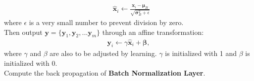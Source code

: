 \documentclass[11pt,letter,notitlepage]{article}
\begin{document}
\begin{exercise}
\begin{enumerate}[resume]
\begin{enumerate}
\begin{align*}
        &\hat{\mathbf{x}}_i \leftarrow \frac{\mathbf{x}_i - \mathbf{\mu}_B}{\sqrt{\mathbf{\sigma}_B^2 + \epsilon}}
        \end{align*}
        where $\epsilon$ is a very small number to prevent division by zero.\\
        Then output $\mathbf{y} = \{\mathbf{y}_1, \mathbf{y}_2, ... \mathbf{y}_m\}$ through an affine transformation:
        \begin{align*}
        \mathbf{y}_i \leftarrow \gamma \hat{\mathbf{x}}_i + \mathbf{\beta},
        \end{align*}
        where $\gamma$ and $\beta$ are also to be adjusted by learning. $\gamma$ is initialized with 1 and $\beta$ is initialized with 0.\\
        Compute the back propagation of \textbf{Batch Normalization Layer}.
    \end{enumerate}
\end{enumerate}

\end{exercise}

\begin{solution}
    
\end{solution}
\end{document}
